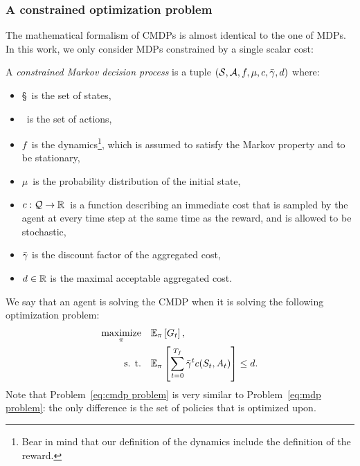 		\subsubsection{A constrained optimization problem}
		The mathematical formalism of CMDPs is almost identical to the one of MDPs. In this work, we only consider MDPs constrained by a single scalar cost:
		\begin{definition}
			A \emph{constrained Markov decision process} is a tuple $(\mathcal{S}, \mathcal{A}, f, \mu, c, \bar{\gamma}, d)$ where:
			\begin{itemize}
				\item \S~is the set of states,
				\item \A~is the set of actions,
				\item $f$~is the dynamics\footnote{Bear in mind that our definition of the dynamics include the definition of the reward.}, which is assumed to satisfy the Markov property and to be stationary,
				\item $\mu$~is the probability distribution of the initial state,
				\item $c: \mathcal{Q}\to \mathbb{R}$~is a function describing an immediate cost that is sampled by the agent at every time step at the same time as the reward, and is allowed to be stochastic,
				\item $\bar{\gamma}$ is the discount factor of the aggregated cost,
				\item $d \in \mathbb{R}$ is the maximal acceptable aggregated cost.
			\end{itemize}
		\end{definition}
		We say that an agent is solving the CMDP when it is solving the following optimization problem:
		\begin{equation}
		\begin{aligned}
			\underset{\pi}{\text{maximize}} & \quad\mathbb{E}_\pi\left[G_t\right], \\
			\text{s. t.} & \quad\mathbb{E}_\pi\left[\sum_{t=0}^{{T_f}}\bar{\gamma}^tc(S_t, A_t)\right] \leq d.
		\end{aligned} \label{eq:cmdp problem}
		\end{equation}
		Note that Problem~\eqref{eq:cmdp problem} is very similar to Problem~\eqref{eq:mdp problem}: the only difference is the set of policies that is optimized upon. 
		
